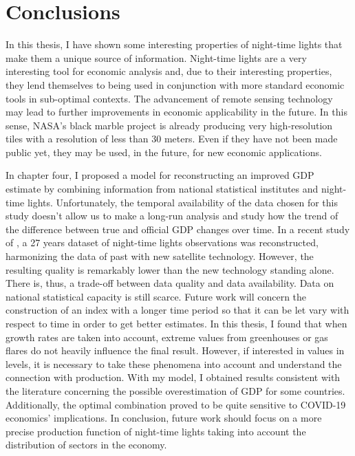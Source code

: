 \chapter{Conclusions}\label{ch:conclusions}

In this thesis, I have shown some interesting properties of night-time lights that make them a unique source of information. 
Night-time lights are a very interesting tool for economic analysis and, due to their interesting properties, they lend themselves to being used in conjunction with more standard economic tools in sub-optimal contexts. 
The advancement of remote sensing technology may lead to further improvements in economic applicability in the future. In this sense, NASA's black marble project is already producing very high-resolution tiles with a resolution of less than 30 meters. Even if they have not been made public yet, they may be used, in the future, for new economic applications.

In chapter four, I proposed a model for reconstructing an improved GDP estimate by combining information from national statistical institutes and night-time lights.
Unfortunately, the temporal availability of the data chosen for this study doesn't allow us to make a long-run analysis and study how the trend of the difference between true and official GDP changes over time. In a recent study of \citet{li2020harmonized}, a 27 years dataset of night-time lights observations was reconstructed, harmonizing the data of past with new satellite technology. However, the resulting quality is remarkably lower than the new technology standing alone. There is, thus, a trade-off between data quality and data availability.
Data on national statistical capacity is still scarce. Future work will concern the construction of an index with a longer time period so that it can be let vary with respect to time in order to get better estimates.
In this thesis, I found that when growth rates are taken into account, extreme values from greenhouses or gas flares do not heavily influence the final result. However, if interested in values in levels, it is necessary to take these phenomena into account and understand the connection with production.
With my model, I obtained results consistent with the literature concerning the possible overestimation of GDP for some countries. Additionally, the optimal combination proved to be quite sensitive to COVID-19 economics' implications.
In conclusion, future work should focus on a more precise production function of night-time lights taking into account the distribution of sectors in the economy.
